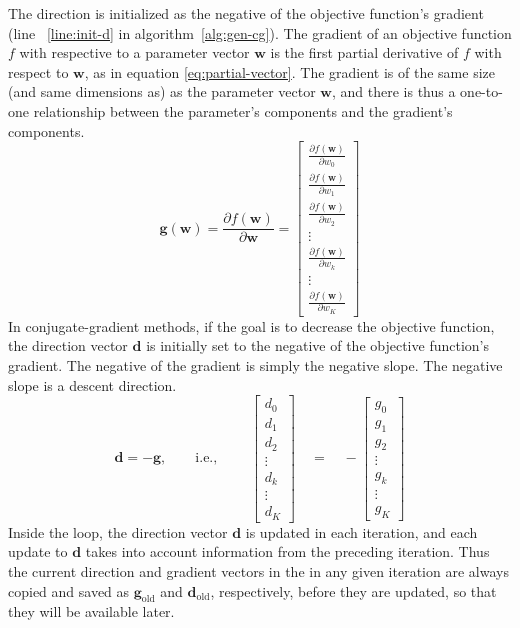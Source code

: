 The direction is initialized as the negative of the objective function's gradient
(line ~\ref{line:init-d} in algorithm~\ref{alg:gen-cg}). The gradient of an objective
function $f$ with respective to a parameter vector $\textbf{w}$ is the first partial derivative of $f$ with respect to
$\textbf{w}$, as in equation \eqref{eq:partial-vector}.  The gradient is of the same size (and same dimensions as) as the parameter vector $\textbf{w}$, and there is thus a one-to-one relationship between the parameter's components and the gradient's components.
\begin{equation}
\label{eq:partial-vector}
\textbf{g}(\mathbf{w}) = \frac{\partial f(\mathbf{w})}{\partial \mathbf{w}} =
  \begin{bmatrix}
    \frac{\partial f(\mathbf{w})}{\partial w_0}\\
    \frac{\partial f(\mathbf{w})}{\partial w_1} \\
    \frac{\partial f(\mathbf{w})}{\partial w_2}\\
    \vdots \\
	\frac{\partial f(\mathbf{w})}{\partial w_k}\\
	\vdots \\
	\frac{\partial f(\mathbf{w})}{\partial w_K}
  \end{bmatrix}
\end{equation}
In conjugate-gradient methods, if the goal is to decrease the objective function, the direction vector $\textbf{d}$  is initially set to the negative of the objective function's gradient. The negative of the gradient is simply the negative slope.  The negative slope is a descent direction. 
\begin{equation}
\textbf{d} = - \textbf{g}, \qquad \text{i.e., } \qquad
 \begin{bmatrix}
      d_0\\
    d_1 \\
   d_2\\
    \vdots \\
	d_k\\
	\vdots \\
	d_K
  \end{bmatrix} \quad =
\quad 
-\begin{bmatrix}
    g_0\\
    g_1 \\
   g_2\\
    \vdots \\
	g_k\\
	\vdots \\
	g_K
	\end{bmatrix}
  \end{equation}
Inside the loop, the direction vector $\textbf{d}$ is updated in each iteration, and each update to  $\textbf{d}$ 
takes into account information from the preceding iteration. Thus the current direction and gradient vectors in the in any given iteration are always copied and saved as $\textbf{g}_ {\text{old}}$ and $\textbf{d}_{\text{old}}$, respectively, before they are updated, so that they will be available later. 


